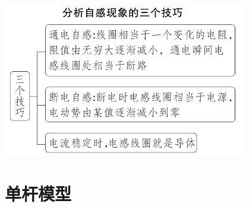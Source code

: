 \documentclass{article}
\begin{document}
\vspace{2em}

\includegraphics[width = 0.8\textwidth]{pictures/3.png}



\vspace{2em}

\section{单杆模型}
\end{document}
